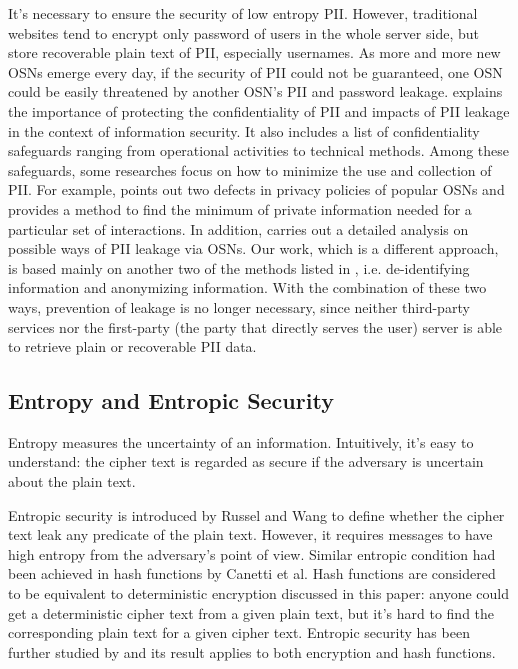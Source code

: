 \documentclass[10pt, conference, compsocconf]{IEEEtran}
\begin{document}
	It's necessary to ensure the security of low entropy PII. However,
    traditional websites tend to encrypt only password of users in the whole server side,
    but store recoverable plain text of PII, especially usernames. 
    As more and more new OSNs emerge every day,
    if the security of PII could not be guaranteed,
    one OSN could be easily threatened by another OSN's PII and password leakage. \cite{guide}
    explains the importance of protecting the confidentiality of PII
    and impacts of PII leakage in the
    context of information security. It also includes a list of confidentiality
    safeguards ranging from operational activities to technical methods. Among
    these safeguards, some researches focus on how to minimize the use and
    collection of PII. For example, \cite{charact} points out two defects
    in privacy policies of popular OSNs and provides a method to find the minimum
    of private information needed for a particular set of interactions. In addition,
    \cite{leakage} carries out a detailed analysis on possible ways of PII
    leakage via OSNs. Our work, which is a different approach, is based mainly
    on another two of the methods listed in \cite{guide}, i.e. de-identifying
    information and anonymizing information. With the combination of these two ways,
    prevention of leakage is no longer necessary, since neither third-party services
    nor the first-party (the party that directly serves the user) server is able to
    retrieve plain or recoverable PII data.

    \subsection{Entropy and Entropic Security}
    Entropy\cite{entropy} measures the uncertainty of an information. Intuitively, it's easy to
    understand: the cipher text is regarded as secure
    if the adversary is uncertain about the plain text.

    Entropic security is introduced by Russel and Wang\cite{Russel02howto} to define
    whether the cipher text leak any predicate of the plain text. However,
    it requires messages to have high entropy from
    the adversary's point of view. Similar entropic condition had been
    achieved in hash functions by Canetti et al\cite{Canetti97towardsrealizing, Canetti_perfectlyone-way}.
    Hash functions are
    considered to be equivalent to deterministic encryption discussed in this
    paper: anyone could get a deterministic cipher text from a
    given plain text, but it's hard to find the corresponding plain text
    for a given cipher text. Entropic security has been further
    studied by \cite{entropic_wang}
    and its result applies to both encryption and hash functions.
\end{document}
